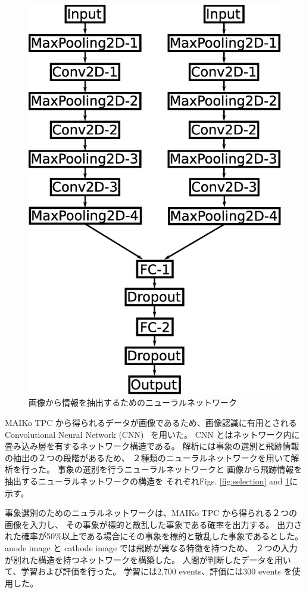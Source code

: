 \documentclass{jps-cp}
\begin{document}
\begin{figure}
\begin{minipage}{0.4\columnwidth}
    \includegraphics[clip, width=0.9\columnwidth]{eps/point_detection.eps}
    \caption{画像から情報を抽出するためのニューラルネットワーク}
    \label{fig:extraction}
  \end{minipage}
\end{figure}

MAIKo TPC から得られるデータが画像であるため、画像認識に有用とされる
Convolutional Neural Network (CNN)~\cite{lenet,alexnet} を用いた。
CNN とはネットワーク内に畳み込み層を有するネットワーク構造である。
解析には事象の選別と飛跡情報の抽出の２つの段階があるため、
２種類のニューラルネットワークを用いて解析を行った。
事象の選別を行うニューラルネットワークと
画像から飛跡情報を抽出するニューラルネットワークの構造を
それぞれFigs. \ref{fig:selection} and \ref{fig:extraction}に示す。

事象選別のためのニュラルネットワークは、MAIKo TPC から得られる２つの画像を入力し、
その事象が標的と散乱した事象である確率を出力する。
出力された確率が50\%以上である場合にその事象を標的と散乱した事象であるとした。
anode image と cathode image では飛跡が異なる特徴を持つため、
２つの入力が別れた構造を持つネットワークを構築した。
人間が判断したデータを用いて、学習および評価を行った。
学習には2,700 events、評価には300 events を使用した。
\end{document}
